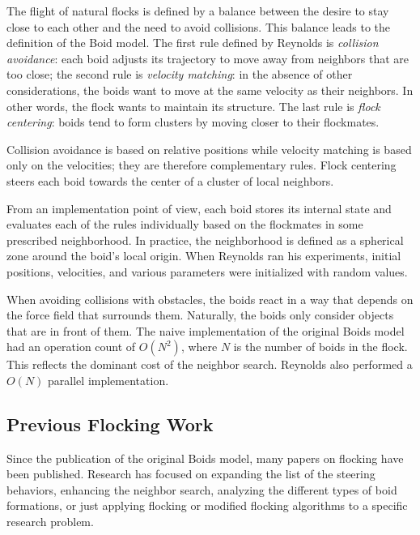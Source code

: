 The flight of natural flocks is defined by a balance between the desire to stay close to each other and the need to avoid collisions. This balance leads to the definition of the Boid model. The first rule defined by Reynolds is \textit{collision avoidance}: each boid adjusts its trajectory to move away from neighbors that are too close;  the second rule is \textit{velocity matching}: in the absence of other considerations, the boids want to move at the same velocity as their neighbors. In other words, the flock wants to maintain its structure. The last rule is \textit{flock centering}: boids tend to form clusters by moving closer to their flockmates. 

Collision avoidance is based on relative positions while velocity matching is based only on the velocities; they are therefore complementary rules. Flock centering steers each boid towards the center of a cluster of local neighbors. 

From an implementation point of view, each boid stores its internal state and evaluates each of the rules individually based on the flockmates in some prescribed neighborhood. In practice, the neighborhood is defined as a spherical zone around the boid's local origin. When Reynolds ran his experiments, initial positions, velocities, and various parameters were initialized with random values. 

When avoiding collisions with obstacles, the boids react in a way that depends on the force field that surrounds them. Naturally, the boids only consider objects that are in front of them. The naive implementation of the original Boids model had an operation count of $O(N^2)$, where $N$ is the number of boids in the flock. This reflects the dominant cost of the neighbor search. Reynolds also performed a $O(N)$ parallel implementation.

\subsection{Previous Flocking Work}\label{currentwork}
Since the publication of the original Boids model, many papers on flocking have been published. Research has focused on expanding the list of the steering behaviors\cite{craigSteeringBehaviors}, enhancing the neighbor search\cite{spatialSwarms}, analyzing the different types of  boid formations\cite{lineFormations}, or just applying flocking or modified flocking algorithms to a specific research problem.

